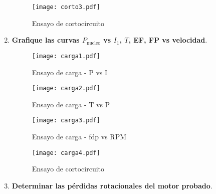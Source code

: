 \documentclass[a4paper,11pt]{article}
\newcommand{\mrm}{\mathrm}
\begin{document}
\begin{enumerate}
    \begin{figure}[H]
        \centering
        \texttt{[image: corto3.pdf]}
        \caption{Ensayo de cortocircuito}
    \end{figure}
    \newpage
    \item \textbf{Grafique las curvas $P_{\mrm{nucleo}}$ vs $I_{1}$, $T$, EF, FP vs velocidad}.
    \begin{figure}[H]
        \centering
        \texttt{[image: carga1.pdf]}
        \caption{Ensayo de carga - P vs I}
    \end{figure}
    \begin{figure}[H]
        \centering
        \texttt{[image: carga2.pdf]}
        \caption{Ensayo de carga - T vs P}
    \end{figure}
    \begin{figure}[H]
        \centering
        \texttt{[image: carga3.pdf]}
        \caption{Ensayo de carga - fdp vs RPM}
    \end{figure}
    \begin{figure}[H]
        \centering
        \texttt{[image: carga4.pdf]}
        \caption{Ensayo de cortocircuito}
    \end{figure}
    \newpage
    \item \textbf{Determinar las pérdidas rotacionales del motor probado}.
    

\end{enumerate}
\end{document}
